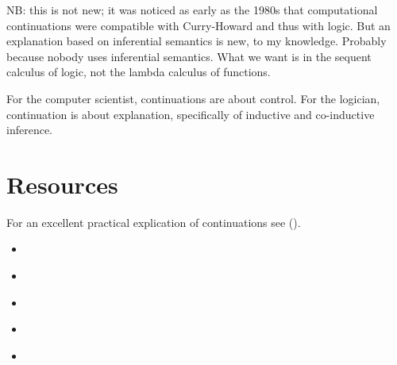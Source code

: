 NB: this is not new; it was noticed as early as the 1980s
\parencite{griffin_ch_control} that computational continuations were
compatible with Curry-Howard and thus with logic. But an explanation
based on inferential semantics is new, to my knowledge. Probably
because nobody uses inferential semantics. What we want is in the
sequent calculus of logic, not the lambda calculus of functions.

For the computer scientist, continuations are about control. For the
logician, continuation is about explanation, specifically of inductive
and co-inductive inference.

\section{Resources}

For an excellent practical explication of continuations see  (\cite{queinnec2003lisp}).

\begin{itemize}
\item {} \cite{griffin_ch_control}
\item {} \cite{Strachey2000ContinuationsAM}
\item {} \cite{discovery_continuations}
\item {} \cite{10.1145/62678.62684}
\item {} \cite{reasoning_continuations_2}
\end{itemize}

